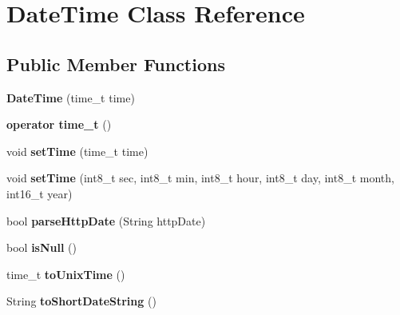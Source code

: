 \hypertarget{class_date_time}{}\section{Date\+Time Class Reference}
\label{class_date_time}
\subsection*{Public Member Functions}
\begin{DoxyCompactItemize}
\item 
\hypertarget{class_date_time_a3c663103e819ac0925be93b06a35931b}{}{\bfseries Date\+Time} (time\+\_\+t time)\label{class_date_time_a3c663103e819ac0925be93b06a35931b}

\item 
\hypertarget{class_date_time_a71771ccc110639ab07f7d91a81a62287}{}{\bfseries operator time\+\_\+t} ()\label{class_date_time_a71771ccc110639ab07f7d91a81a62287}

\item 
\hypertarget{class_date_time_a76cec1408d44dba7b3b9b350e7e93af4}{}void {\bfseries set\+Time} (time\+\_\+t time)\label{class_date_time_a76cec1408d44dba7b3b9b350e7e93af4}

\item 
\hypertarget{class_date_time_a9d7e7be864d50b4049a14956706af5af}{}void {\bfseries set\+Time} (int8\+\_\+t sec, int8\+\_\+t min, int8\+\_\+t hour, int8\+\_\+t day, int8\+\_\+t month, int16\+\_\+t year)\label{class_date_time_a9d7e7be864d50b4049a14956706af5af}

\item 
\hypertarget{class_date_time_aafc5f31a9aab859d6e12553621ed7568}{}bool {\bfseries parse\+Http\+Date} (String http\+Date)\label{class_date_time_aafc5f31a9aab859d6e12553621ed7568}

\item 
\hypertarget{class_date_time_a942983c6d456157328d2efa10e06b9fb}{}bool {\bfseries is\+Null} ()\label{class_date_time_a942983c6d456157328d2efa10e06b9fb}

\item 
\hypertarget{class_date_time_a9e19ab63fe8ee41e00ffee8740a1d29c}{}time\+\_\+t {\bfseries to\+Unix\+Time} ()\label{class_date_time_a9e19ab63fe8ee41e00ffee8740a1d29c}

\item 
\hypertarget{class_date_time_a67ae33e61bac3267c8709e986e5c9865}{}String {\bfseries to\+Short\+Date\+String} ()\label{class_date_time_a67ae33e61bac3267c8709e986e5c9865}


\end{DoxyCompactItemize}
